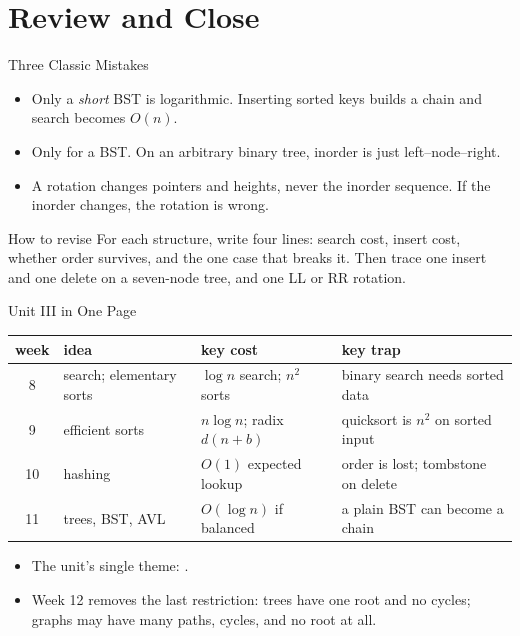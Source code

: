 \documentclass[aspectratio=169]{beamer}
\begin{document}
\section{Review and Close}

\begin{frame}{Three Classic Mistakes}
  \begin{itemize}
    \item {} Only a
      \emph{short} BST is logarithmic. Inserting sorted keys builds a chain
      and search becomes $O(n)$.
    \item {} Only for a BST. On an arbitrary
      binary tree, inorder is just left--node--right.
    \item {} A rotation changes pointers
      and heights, never the inorder sequence. If the inorder changes, the
      rotation is wrong.
  \end{itemize}
  \begin{exampleblock}{How to revise}
    For each structure, write four lines: search cost, insert cost, whether
    order survives, and the one case that breaks it. Then trace one insert
    and one delete on a seven-node tree, and one LL or RR rotation.
  \end{exampleblock}
\end{frame}

\begin{frame}{Unit III in One Page}
  \begin{center}
  {\scriptsize
  \begin{tabular}{c l l l}
    \toprule
    \textbf{week} & \textbf{idea} & \textbf{key cost} & \textbf{key trap} \\
    \midrule
    8 & search; elementary sorts &
      $\log n$ search; $n^2$ sorts & binary search needs sorted data \\
    9 & efficient sorts &
      $n\log n$; radix $d(n+b)$ & quicksort is $n^2$ on sorted input \\
    10 & hashing &
      $O(1)$ expected lookup & order is lost; tombstone on delete \\
    11 & trees, BST, AVL &
      $O(\log n)$ if balanced & a plain BST can become a chain \\
    \bottomrule
  \end{tabular}}
  \end{center}
  \begin{itemize}
    \item The unit's single theme: .
    \item Week 12 removes the last restriction: trees have one root and no
      cycles; graphs may have many paths, cycles, and no root at all.
  \end{itemize}
\end{frame}
\end{document}
